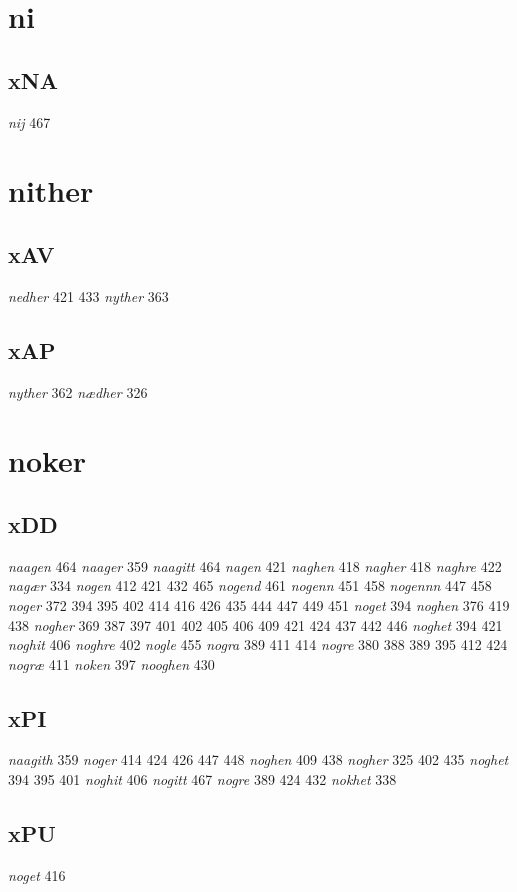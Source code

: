 \documentclass[a4paper,twocolumn]{article}
\begin{document}
\section{ni}
\label{sec:org824ec41}
\subsection{xNA}
\label{sec:org3351721}
\emph{nij} 467 
\section{nither}
\label{sec:orgd2b3399}
\subsection{xAV}
\label{sec:org570acb7}
\emph{nedher} 421 433 \emph{nyther} 363 
\subsection{xAP}
\label{sec:org64eb982}
\emph{nyther} 362 \emph{nædher} 326 
\section{noker}
\label{sec:orgf2acef3}
\subsection{xDD}
\label{sec:org6a43940}
\emph{naagen} 464 \emph{naager} 359 \emph{naagitt} 464 \emph{nagen} 421 \emph{naghen} 418 \emph{nagher} 418 \emph{naghre} 422 \emph{nagær} 334 \emph{nogen} 412 421 432 465 \emph{nogend} 461 \emph{nogenn} 451 458 \emph{nogennn} 447 458 \emph{noger} 372 394 395 402 414 416 426 435 444 447 449 451 \emph{noget} 394 \emph{noghen} 376 419 438 \emph{nogher} 369 387 397 401 402 405 406 409 421 424 437 442 446 \emph{noghet} 394 421 \emph{noghit} 406 \emph{noghre} 402 \emph{nogle} 455 \emph{nogra} 389 411 414 \emph{nogre} 380 388 389 395 412 424 \emph{nogræ} 411 \emph{noken} 397 \emph{nooghen} 430 
\subsection{xPI}
\label{sec:orgcddeb8f}
\emph{naagith} 359 \emph{noger} 414 424 426 447 448 \emph{noghen} 409 438 \emph{nogher} 325 402 435 \emph{noghet} 394 395 401 \emph{noghit} 406 \emph{nogitt} 467 \emph{nogre} 389 424 432 \emph{nokhet} 338 
\subsection{xPU}
\label{sec:orgd6dfbf7}
\emph{noget} 416 
\end{document}
